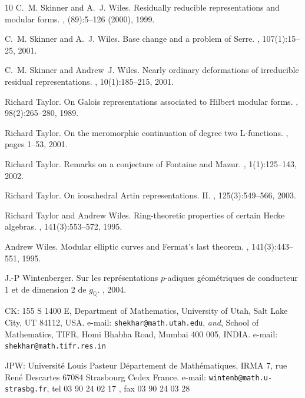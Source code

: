 \documentclass[12pt]{article}
\newcommand{\Q}{\mathbb{Q}}
\begin{document}
\begin{thebibliography}{10}
C.~M. Skinner and A.~J. Wiles.
\newblock Residually reducible representations and modular forms.
, (89):5--126 (2000),
  1999.

C.~M. Skinner and A.~J. Wiles.
\newblock Base change and a problem of {S}erre.
, 107(1):15--25, 2001.

C.~M. Skinner and Andrew~J. Wiles.
\newblock Nearly ordinary deformations of irreducible residual representations.
, 10(1):185--215, 2001.

Richard Taylor.
\newblock On {G}alois representations associated to {H}ilbert modular forms.
, 98(2):265--280, 1989.

\bibitem{[T03]}
Richard Taylor.
\newblock On the meromorphic continuation of degree two {L}-functions.
, pages 1--53, 2001.

\bibitem{[T02]}
Richard Taylor.
\newblock Remarks on a conjecture of {F}ontaine and {M}azur.
, 1(1):125--143, 2002.

\bibitem{[T03ico]}
Richard Taylor.
\newblock On icosahedral {A}rtin representations. {II}.
, 125(3):549--566, 2003.

Richard Taylor and Andrew Wiles.
\newblock Ring-theoretic properties of certain {H}ecke algebras.
, 141(3):553--572, 1995.

Andrew Wiles.
\newblock Modular elliptic curves and {F}ermat's last theorem.
, 141(3):443--551, 1995.

J.-P Wintenberger.
\newblock Sur les repr\'esentations $p$-adiques g\'eom\'etriques de conducteur
  1 et de dimension 2 de $g_{\Q}$.
, 2004.

\end{thebibliography}




\noindent CK:
155 S 1400 E,
Department of Mathematics,
University of Utah,
Salt Lake City,
UT 84112,
USA. e-mail: {\tt shekhar@math.utah.edu}, {\it and},
\noindent School of Mathematics,
TIFR,
Homi Bhabha Road,
Mumbai 400 005,
INDIA. e-mail: {\tt shekhar@math.tifr.res.in}

\vspace{3mm}

\noindent JPW:
Universit\'e Louis Pasteur
D\'epartement de Math\'ematiques, IRMA
7, rue Ren\'e Descartes
67084 Strasbourg Cedex
France. e-mail: {\tt wintenb@math.u-strasbg.fr},
tel 03 90 24 02 17 , fax 03 90 24 03 28
\end{document}
